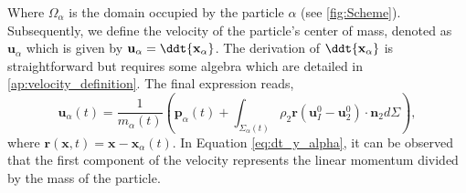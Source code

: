 Where $\Omega_\alpha$ is the domain occupied by the particle $\alpha$ (see \ref{fig:Scheme}). 
Subsequently, we define the velocity of the particle's center of mass, denoted as $\textbf{u}_\alpha$ which is given by $\textbf{u}_\alpha = \ddt{ \textbf{x}_\alpha}$. 
The derivation of $\ddt {\textbf{x}_\alpha}$ is straightforward but requires some algebra which are detailed in \ref{ap:velocity_definition}. 
The final expression reads,
\begin{equation}
    \textbf{u}_\alpha(t) = \frac{1}{m_\alpha(t)} \left(
        \textbf{p}_\alpha(t)
        +  \int_{\Sigma_\alpha(t)} \rho_2 \textbf{r} (\textbf{u}_I^0 - \textbf{u}_2^0)\cdot \textbf{n}_2 d\Sigma
        \right),
        \label{eq:dt_y_alpha}
\end{equation}
where $\textbf{r}(\textbf{x},t) = \textbf{x} - \textbf{x}_\alpha(t)$. 
In Equation \ref{eq:dt_y_alpha}, it can be observed that the first component of the velocity represents the linear momentum divided by the mass of the particle. 

